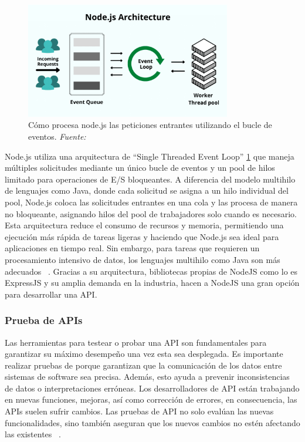 \begin{figure}[H]
	\centering
	\includegraphics[width=0.8\textwidth]{img/chapter03/node-architecture.png}
	\caption[Cómo procesa node.js las peticiones entrantes utilizando el bucle de eventos]{Cómo procesa node.js las peticiones entrantes utilizando el bucle de eventos. \textit{Fuente: ~\cite{NodeJSKinsta}}}
	\label{fig:nodejs_arqui}  %
\end{figure}
Node.js utiliza una arquitectura de “Single Threaded Event Loop” \ref{fig:nodejs_arqui} que maneja múltiples solicitudes mediante un único bucle de eventos y un pool de hilos limitado para operaciones de E/S bloqueantes. A diferencia del modelo multihilo de lenguajes como Java, donde cada solicitud se asigna a un hilo individual del pool, Node.js coloca las solicitudes entrantes en una cola y las procesa de manera no bloqueante, asignando hilos del pool de trabajadores solo cuando es necesario. Esta arquitectura reduce el consumo de recursos y memoria, permitiendo una ejecución más rápida de tareas ligeras y haciendo que Node.js sea ideal para aplicaciones en tiempo real. Sin embargo, para tareas que requieren un procesamiento intensivo de datos, los lenguajes multihilo como Java son más adecuados ~\cite{NodeJSKinsta}.
Gracias a su arquitectura, bibliotecas propias de NodeJS como lo es ExpressJS y su amplia demanda en la industria, hacen a NodeJS una gran opción para desarrollar una API.


\subsubsection{Prueba de APIs}
Las herramientas para testear o probar una API son fundamentales para garantizar su máximo desempeño una vez esta sea desplegada. Es importante realizar pruebas de porque garantizan que la comunicación de los datos entre sistemas de software sea precisa. Además, esto ayuda a prevenir inconsistencias de datos o interpretaciones erróneas. Los desarrolladores de API están trabajando en nuevas funciones, mejoras, así como corrección de errores, en consecuencia, las APIs suelen sufrir cambios. Las pruebas de API no solo evalúan las nuevas funcionalidades, sino también aseguran que los nuevos cambios no estén afectando las existentes ~\cite{Postman-QAlified}.

